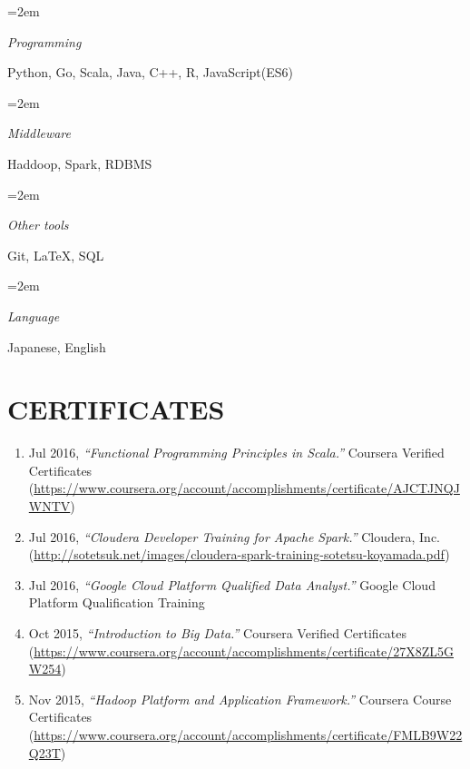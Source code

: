 \documentclass[paper=a4,fontsize=11pt]{scrartcl} %
\newlength{\spacebox}
\newcommand{\NewPart}[1]{\section*{\uppercase{#1}}}
\newcommand{\PersonalEntry}[2]{
		\noindent\hangindent=2em\hangafter=0 %
		\parbox{\spacebox}{        %
		\textit{#1}}		       %
		\hspace{1.5em} #2 \par}    %
\newcommand{\SkillsEntry}[2]{      %
		\noindent\hangindent=2em\hangafter=0 %
		\parbox{\spacebox}{        %
		\textit{#1}}			   %
		\hspace{1.5em} #2 \par}    %
\begin{document}

\SkillsEntry{Programming}{Python, Go, Scala, Java, C++, R, JavaScript(ES6)}
\SkillsEntry{Middleware}{Haddoop, Spark, RDBMS}
\SkillsEntry{Other tools}{Git, LaTeX, SQL}
\SkillsEntry{Language}{Japanese, English}

\NewPart{Certificates}{}

\begin{enumerate}
        \item Jul 2016, {\em ``Functional Programming Principles in Scala.''} Coursera Verified Certificates \\{\footnotesize (\url{https://www.coursera.org/account/accomplishments/certificate/AJCTJNQJWNTV})}
	\item Jul 2016, {\em ``Cloudera Developer Training for Apache Spark.''} Cloudera, Inc. \\{\footnotesize (\url{http://sotetsuk.net/images/cloudera-spark-training-sotetsu-koyamada.pdf})}
        \item Jul 2016, {\em ``Google Cloud Platform Qualified Data Analyst.''} Google Cloud Platform Qualification Training 
	\item Oct 2015, {\em ``Introduction to Big Data.''} Coursera Verified Certificates \\{\footnotesize (\url{https://www.coursera.org/account/accomplishments/certificate/27X8ZL5GW254})}
	\item Nov 2015, {\em ``Hadoop Platform and Application Framework.''} Coursera Course Certificates \\{\footnotesize (\url{https://www.coursera.org/account/accomplishments/certificate/FMLB9W22Q23T})}
\end{enumerate}
\end{document}
